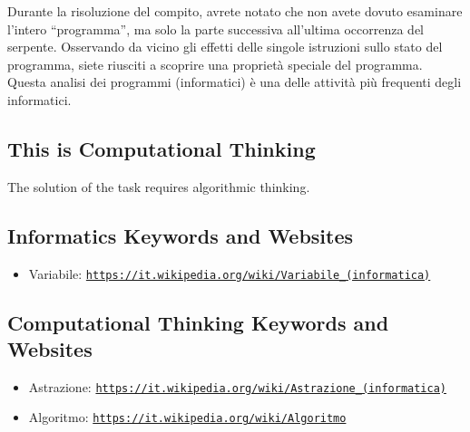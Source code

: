 \documentclass[a4paper,11pt]{report}
\newcommand{\BrochureUrlText}[1]{\texttt{#1}}
\begin{document}
Durante la risoluzione del compito, avrete notato che non avete dovuto esaminare l’intero \enquote{programma}, ma solo la parte successiva all’ultima occorrenza del serpente. Osservando da vicino gli effetti delle singole istruzioni sullo stato del programma, siete riusciti a scoprire una proprietà speciale del programma. Questa analisi dei programmi (informatici) è una delle attività più frequenti degli informatici.


\subsection*{This is Computational Thinking}

The solution of the task requires algorithmic thinking.


\subsection*{Informatics Keywords and Websites}

\begin{itemize}
  \item Variabile: \href{https://it.wikipedia.org/wiki/Variabile_(informatica)}{\BrochureUrlText{https://it.wikipedia.org/wiki/Variabile\_(informatica)}}
\end{itemize}


\subsection*{Computational Thinking Keywords and Websites}

\begin{itemize}
  \item Astrazione: \href{https://it.wikipedia.org/wiki/Astrazione_(informatica)}{\BrochureUrlText{https://it.wikipedia.org/wiki/Astrazione\_(informatica)}}
  \item Algoritmo: \href{https://it.wikipedia.org/wiki/Algoritmo}{\BrochureUrlText{https://it.wikipedia.org/wiki/Algoritmo}}
\end{itemize}
\end{document}
